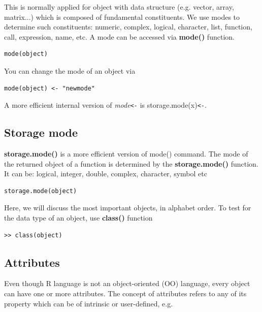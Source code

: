 This is normally applied for object with data structure (e.g. vector,
array, matrix...) which is composed of fundamental constituents. We
use modes to determine such constituents: numeric, complex, logical,
character, list, function, call, expression, name, etc. A mode can be
accessed via {\bf mode()} function.

\begin{lstlisting}
mode(object)
\end{lstlisting}

You can change the mode of an object via
\begin{lstlisting}
mode(object) <- "newmode"
\end{lstlisting}
A more efficient internal version of {\it mode\verb|<-|} is storage.mode(x)\verb|<-|.
\subsection{Storage mode}
\label{sec:storage-mode}

{\bf storage.mode()} is a more efficient version of mode() command.
The mode of the returned object of a function is determined by the
{\bf storage.mode()} function. It can be: logical, integer, double,
complex, character, symbol etc

\begin{lstlisting}
storage.mode(object)
\end{lstlisting}

Here, we will discuss the most important objects, in alphabet
order. To test for the data type of an object, use {\bf class()}
function

\begin{lstlisting}
>> class(object)
\end{lstlisting}

\subsection{Attributes}
\label{sec:attributes}

Even though R language is not an object-oriented (OO) language, every
object can have one or more attributes. The concept of attributes
refers to any of its property which can be of intrinsic or
user-defined, e.g.

